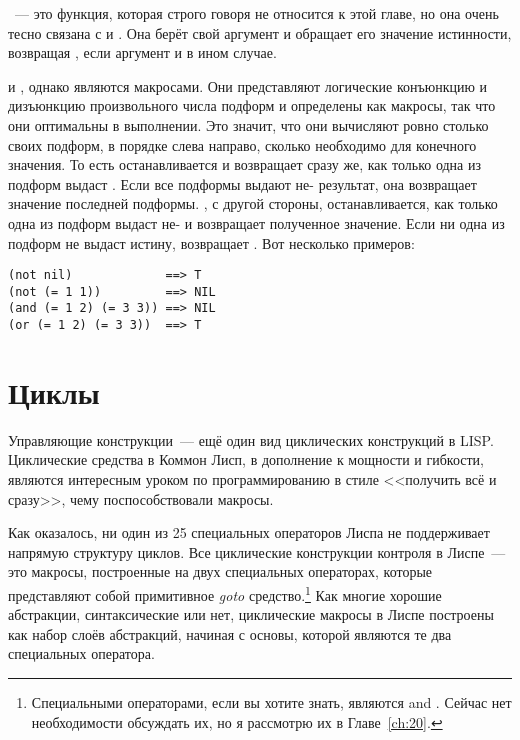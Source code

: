 ~--- это функция, которая строго говоря не относится к этой главе, но она очень
тесно связана с  и . Она берёт свой аргумент и обращает его значение
истинности, возвращая , если аргумент  и  в ином случае.

 и , однако являются макросами. Они представляют логические конъюнкцию
и дизъюнкцию произвольного числа подформ и определены как макросы, так что они оптимальны
в выполнении. Это значит, что они вычисляют ровно столько своих подформ, в порядке слева
направо, сколько необходимо для конечного значения. То есть  останавливается и
возвращает  сразу же, как только одна из подформ выдаст . Если все
подформы выдают не- результат, она возвращает значение последней
подформы. , с другой стороны, останавливается, как только одна из подформ выдаст
не- и возвращает полученное значение. Если ни одна из подформ не выдаст истину,
 возвращает . Вот несколько примеров:

\begin{lstlisting}
(not nil)             ==> T
(not (= 1 1))         ==> NIL
(and (= 1 2) (= 3 3)) ==> NIL
(or (= 1 2) (= 3 3))  ==> T
\end{lstlisting}

\section{Циклы}

Управляющие конструкции~--- ещё один вид циклических конструкций в LISP.  Циклические средства в Коммон Лисп, в дополнение к
мощности и гибкости, являются интересным уроком по программированию в стиле <<получить всё
и сразу>>, чему поспособствовали макросы.

Как оказалось, ни один из 25 специальных операторов Лиспа не поддерживает напрямую
структуру циклов. Все циклические конструкции контроля в Лиспе~--- это макросы, построенные
на двух специальных операторах, которые представляют собой примитивное \textit{goto}
средство.\footnote{Специальными операторами, если вы хотите знать, являются 
  and . Сейчас нет необходимости обсуждать их, но я рассмотрю их в Главе~\ref{ch:20}.} Как
многие хорошие абстракции, синтаксические или нет, циклические макросы в Лиспе построены
как набор слоёв абстракций, начиная с основы, которой являются те два специальных
оператора.

